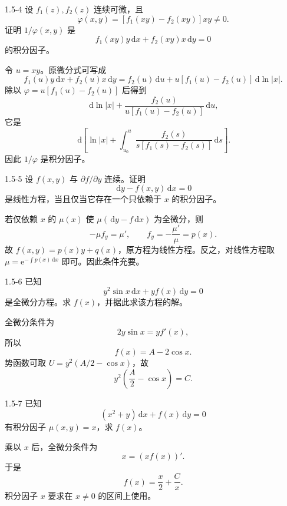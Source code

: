 \documentclass[UTF8,a4paper,11pt]{ctexart}
\newcommand{\dd}{\,\mathrm d}
\newcommand{\e}{\mathrm e}
\begin{document}
\begin{problem}{1.5-4}
设 $f_1(z),f_2(z)$ 连续可微，且
  \[
    \varphi(x,y)=[f_1(xy)-f_2(xy)]xy\ne0.
  \]
  证明 $1/\varphi(x,y)$ 是
  \[
    f_1(xy)y\dd x+f_2(xy)x\dd y=0
  \]
  的积分因子。
\end{problem}

\begin{solution}
令 $u=xy$。原微分式可写成
\[
f_1(u)y\dd x+f_2(u)x\dd y
=f_2(u)\dd u+u[f_1(u)-f_2(u)]\dd\ln|x|.
\]
除以 $\varphi=u[f_1(u)-f_2(u)]$ 后得到
\[
\dd\ln|x|+\frac{f_2(u)}{u[f_1(u)-f_2(u)]}\dd u,
\]
它是
\[
\dd\left[\ln|x|+
\int_{u_0}^{u}\frac{f_2(s)}{s[f_1(s)-f_2(s)]}\dd s\right].
\]
因此 $1/\varphi$ 是积分因子。
\end{solution}

\begin{problem}{1.5-5}
设 $f(x,y)$ 与 $\partial f/\partial y$ 连续。证明
  \[
    \dd y-f(x,y)\dd x=0
  \]
  是线性方程，当且仅当它存在一个只依赖于 $x$ 的积分因子。
\end{problem}

\begin{solution}
若仅依赖 $x$ 的 $\mu(x)$ 使 $\mu(\dd y-f\dd x)$ 为全微分，则
\[
-\mu f_y=\mu',\qquad f_y=-\frac{\mu'}\mu=p(x).
\]
故 $f(x,y)=p(x)y+q(x)$，原方程为线性方程。反之，对线性方程取 $\mu=\e^{-\int p(x)\dd x}$ 即可。因此条件充要。
\end{solution}

\begin{problem}{1.5-6}
已知
  \[
    y^2\sin x\dd x+yf(x)\dd y=0
  \]
  是全微分方程。求 $f(x)$，并据此求该方程的解。
\end{problem}

\begin{solution}
全微分条件为
\[
2y\sin x=yf'(x),
\]
所以
\[
\boxed{f(x)=A-2\cos x}.
\]
势函数可取 $U=y^2(A/2-\cos x)$，故
\[
\boxed{y^2\left(\frac A2-\cos x\right)=C}.
\]
\end{solution}

\begin{problem}{1.5-7}
已知
  \[
    (x^2+y)\dd x+f(x)\dd y=0
  \]
  有积分因子 $\mu(x,y)=x$，求 $f(x)$。
\end{problem}

\begin{solution}
乘以 $x$ 后，全微分条件为
\[
x=(xf(x))'.
\]
于是
\[
\boxed{f(x)=\frac x2+\frac Cx}.
\]
积分因子 $x$ 要求在 $x\ne0$ 的区间上使用。
\end{solution}
\end{document}
